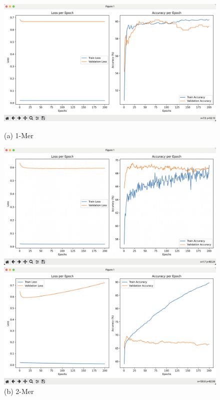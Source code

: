 \documentclass[a4paper,11pt,AutoFakeBold]{ctexart}
\begin{document}
\begin{figure}[h]
    \centering
    \begin{minipage}{0.49\linewidth}
        \centering
        \includegraphics[height=0.55\linewidth]{Figures/k 1.png}
        \caption*{(a) 1-Mer}
    \end{minipage}
    \begin{minipage}{0.49\linewidth}
        \centering
        \includegraphics[height=0.55\linewidth]{Figures/k 2.png}
        \caption*{(b) 2-Mer}
    \end{minipage}
    \begin{minipage}{0.49\linewidth}
        \centering
        \includegraphics[height=0.55\linewidth]{Figures/k 3.png}

\end{minipage}
\end{figure}
\end{document}
